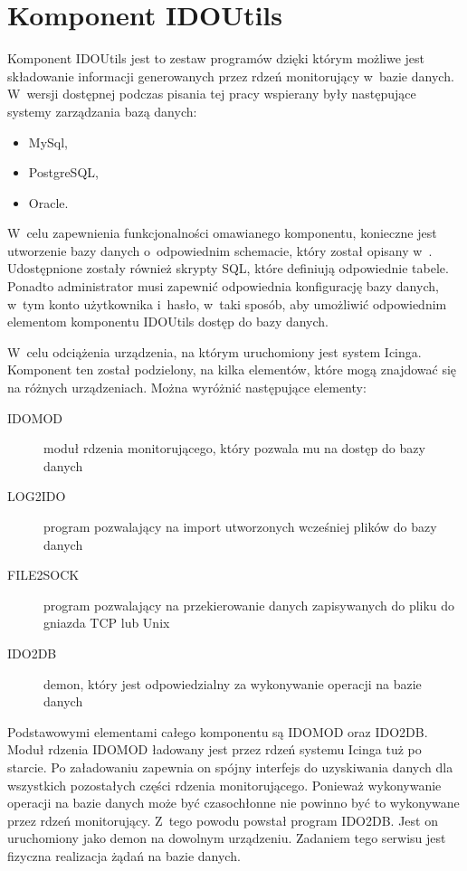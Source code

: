\section[Komponent IDOUtils][Komponent IDOUtils]{Komponent IDOUtils}
\label{sec:IDOUtils}

Komponent IDOUtils jest to zestaw programów dzięki którym możliwe jest
składowanie informacji generowanych przez rdzeń monitorujący w~bazie
danych. W~wersji dostępnej podczas pisania tej pracy wspierany były
następujące systemy zarządzania bazą danych:

\begin{itemize}
\item MySql,
\item PostgreSQL,
\item Oracle.
\end{itemize}

W~celu zapewnienia funkcjonalności omawianego komponentu, konieczne
jest utworzenie bazy danych o~odpowiednim schemacie, który został
opisany w~\cite[669-750]{www:IcingaDoc}. Udostępnione zostały również
skrypty SQL, które definiują odpowiednie tabele. Ponadto administrator
musi zapewnić odpowiednia konfigurację bazy danych, w~tym konto
użytkownika i~hasło, w~taki sposób, aby umożliwić odpowiednim
elementom komponentu IDOUtils dostęp do bazy danych.

W~celu odciążenia urządzenia, na którym uruchomiony jest system
Icinga. Komponent ten został podzielony, na kilka elementów, które
mogą znajdować się na różnych urządzeniach. Można wyróżnić następujące
elementy:

\begin{description}
\item[IDOMOD] moduł rdzenia monitorującego, który pozwala mu na dostęp
  do bazy danych
\item[LOG2IDO] program pozwalający na import utworzonych wcześniej
  plików do bazy danych
\item[FILE2SOCK] program pozwalający na przekierowanie danych
  zapisywanych do pliku do gniazda TCP lub Unix
\item[IDO2DB] demon, który jest odpowiedzialny za wykonywanie operacji
  na bazie danych
\end{description}

Podstawowymi elementami całego komponentu są IDOMOD oraz IDO2DB. Moduł
rdzenia IDOMOD ładowany jest przez rdzeń systemu Icinga tuż po
starcie. Po załadowaniu zapewnia on spójny interfejs do uzyskiwania
danych dla wszystkich pozostałych części rdzenia
monitorującego. Ponieważ wykonywanie operacji na bazie danych może być
czasochłonne nie powinno być to wykonywane przez rdzeń
monitorujący. Z~tego powodu powstał program IDO2DB. Jest on
uruchomiony jako demon na dowolnym urządzeniu. Zadaniem tego serwisu
jest fizyczna realizacja żądań na bazie danych.

